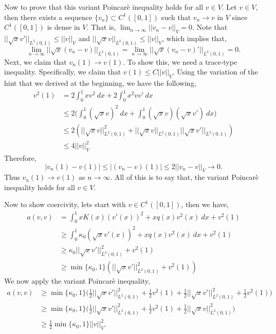\documentclass[11pt]{article}
\begin{document}
Now to prove that this variant Poincar\`{e} inequality holds for all $v \in V$.
Let $v \in V$, then there exists a sequence $\{v_n\} \subset C^1([0,1])$ such that $v_n \to v$ in $V$ since $C^1([0,1])$ is dense in $V$.
That is, $\lim_{n\to\infty} ||v_n - v||_V = 0$.
Note that $||\sqrt{x}v'||_{L^2(0,1)} \leq  ||v||_V$ and $||\sqrt{x}v||_{L^2(0,1)} \leq ||v||_V$, which implies that,
\begin{equation}
	\lim_{n\to\infty} ||\sqrt{x}(v_n - v)||_{L^2(0,1)} = \lim_{n\to\infty} ||\sqrt{x}(v_n - v)'||_{L^2(0,1)} = 0.
\end{equation}
Next, we claim that $v_n(1) \to v(1)$. 
To show this, we need a trace-type inequality.
Specifically, we claim that $v(1) \leq C ||v||_V$.
Using the variation of the hint that we derived at the beginning, we have the following,
\begin{align*}
	v^2(1) &= 2\int_0^1 xv^2 \: dx + 2\int_0^1 x^2 v v' \: dx \\
	&\leq 2 \Big( \int_0^1 (\sqrt{x} v)^2 \: dx + \int_0^1 (\sqrt{x} v) (\sqrt{x} v') \: dx \Big) \\
	&\leq 2 (||\sqrt{x} v||^2_{L^2(0,1)} + ||\sqrt{x} v||_{L^2(0,1)}||\sqrt{x} v'||_{L^2(0,1)} ) \\ 
	&\leq 4 ||v||^2_V
\end{align*}
Therefore,
\begin{equation}
	|v_n(1) - v(1)| \leq |(v_n-v)(1)| \leq 2||v_n - v||_V \to 0.
\end{equation}
Thus $v_n(1) \to v(1)$ as $n\to\infty$.
All of this is to say that, the variant Poincar\`{e} inequality holds for all $v \in V$.

Now to show coercivity, lets start with $v \in C^1([0,1])$, then we have,
\begin{align*}
    a(v,v) &= \int_0^1 x K(x) (v'(x))^2 + xq(x) v^2(x) \: dx + v^2(1) \\
    &\geq \int_0^1 \kappa_0 (\sqrt{x} v'(x))^2 + x q(x) v^2(x) \: dx + v^2(1) \\
    &\geq \kappa_0 ||\sqrt{x} v'||^2_{L^2(0,1)} + v^2(1) \\
    &\geq \min\{ \kappa_0, 1 \} (||\sqrt{x}v'||^2_{L^2(0,1)} + v^2(1) )
\end{align*}
We now apply the variant Poincar\`{e} inequality,
\begin{align*}
	a(v,v) &\geq \min\{\kappa_0, 1\} \Big(\frac{1}{2}||\sqrt{x} v'||^2_{L^2(0,1)} + \frac12 v^2(1) + \frac{1}{2}||\sqrt{x} v'||^2_{L^2(0,1)} + \frac12 v^2(1) \Big) \\
    &\geq \min\{ \kappa_0, 1\} \Big( \frac{1}{2}||\sqrt{x} v'||^2_{L^2(0,1)} + \frac{1}{2} v^2(1) + \frac{1}{2}||\sqrt{x} v||^2_{L^2(0,1)}  \Big) \\
    &\geq \frac{1}{2}\min\{ \kappa_0, 1\} ||v||^2_V.
\end{align*}
\end{document}
